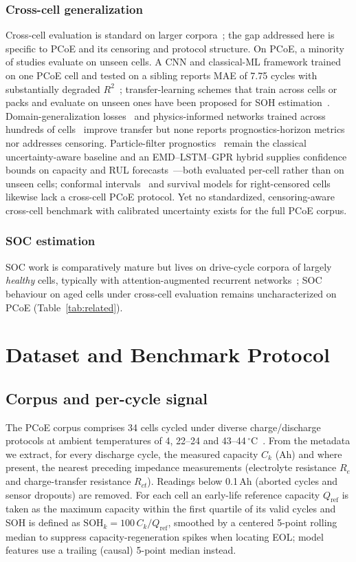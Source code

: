 \documentclass[conference,a4paper]{IEEEtran}
\begin{document}
\subsubsection*{Cross-cell generalization}
Cross-cell evaluation is standard on larger corpora~\cite{severson2019,attia2020}; the gap addressed here is specific to PCoE and its censoring and protocol structure. On PCoE, a minority of studies evaluate on unseen cells. A CNN and classical-ML
framework trained on one PCoE cell and tested on a sibling reports MAE of
7.75 cycles with substantially degraded $R^2$~\cite{cnnframework2026};
transfer-learning schemes that train across cells or packs and evaluate on
unseen ones have been proposed for SOH estimation~\cite{shu2021}.
Domain-generalization losses~\cite{mmd2025} and physics-informed networks
trained across hundreds of cells~\cite{pinn2024} improve transfer but none
reports prognostics-horizon metrics nor addresses censoring. Particle-filter prognostics~\cite{saha2009} remain the classical uncertainty-aware
baseline and an EMD--LSTM--GPR hybrid supplies confidence bounds on
capacity and RUL forecasts~\cite{liu2021uq}---both evaluated per-cell rather
than on unseen cells; conformal intervals~\cite{chen2013} and survival models for right-censored cells~\cite{ibraheem2025} likewise lack a cross-cell PCoE protocol. Yet no standardized,
censoring-aware cross-cell benchmark with calibrated uncertainty exists for
the full PCoE corpus.

\subsubsection*{SOC estimation}
SOC work is comparatively mature but lives on drive-cycle corpora of largely
\emph{healthy} cells, typically with attention-augmented recurrent
networks~\cite{vidal2020}; SOC behaviour on aged cells under cross-cell
evaluation remains uncharacterized on PCoE (Table~\ref{tab:related}).

\section{Dataset and Benchmark Protocol}
\subsection{Corpus and per-cycle signal}
The PCoE corpus comprises 34 cells cycled under diverse charge/discharge
protocols at ambient temperatures of 4, 22--24 and
43--44\,$^\circ$C~\cite{saha2007}. From the metadata we extract, for every
discharge cycle, the measured capacity $C_k$ (Ah) and where present, the
nearest preceding impedance measurements (electrolyte resistance $R_e$ and
charge-transfer resistance $R_{ct}$). Readings below 0.1\,Ah (aborted cycles
and sensor dropouts) are removed. For each cell
an early-life reference capacity $Q_{\mathrm{ref}}$ is taken as the maximum
capacity within the first quartile of its valid cycles and SOH is defined as
$\mathrm{SOH}_k = 100\, C_k / Q_{\mathrm{ref}}$, smoothed by a centered
5-point rolling median to suppress capacity-regeneration spikes when locating
EOL; model features use a trailing (causal) 5-point median instead.
\end{document}

